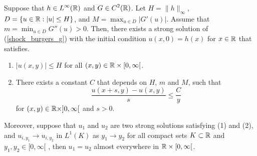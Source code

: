 \begin{theorem} \label{Shock_EUth}
Suppose that $\displaystyle h \in L^\infty(\mathbb{R})$ and
$\displaystyle G \in C^2(\mathbb{R})$.
Let $\displaystyle H = \|h\|_\infty$,  $D = \{ u \in \mathbb{R} : |u| \leq H\}$, and
$\displaystyle M = \max_{u \in D} |G'(u)|$.  Assume that
$\displaystyle m = \min_{u \in D} G''(u) > 0$.  Then, there exists a
strong solution of (\ref{shock_burgers_g}) with the initial condition
$u(x,0) = h(x)$ for $x \in \mathbb{R}$ that satisfies.
\begin{enumerate}
\item $|u(x,y)|\leq H$ for all $(x,y) \in \mathbb{R} \times [0,\infty[$.
\item There exists a constant $C$ that depends on $H$, $m$ and $M$,
such that
\begin{equation} \label{entropy2}
\frac{u(x+s,y)-u(x,y)}{s} \leq \frac{C}{y}
\end{equation}
for $(x,y) \in \mathbb{R} \times ]0,\infty[$ and $s>0$.
\end{enumerate}

Moreover, suppose that $u_1$ and $u_2$ are two strong solutions
satisfying (1) and (2), and $\displaystyle u_{i,y_1} \to u_{i,y_2}$ in
$\displaystyle L^1(K)$ as $y_1 \to y_2$ for all compact sets
$K \subset \mathbb{R}$ and $y_1,y_2 \in [0,\infty[$ \footnotemark,
then $u_1 = u_2$ almost everywhere in $\mathbb{R}\times [0,\infty[$.
\end{theorem}


